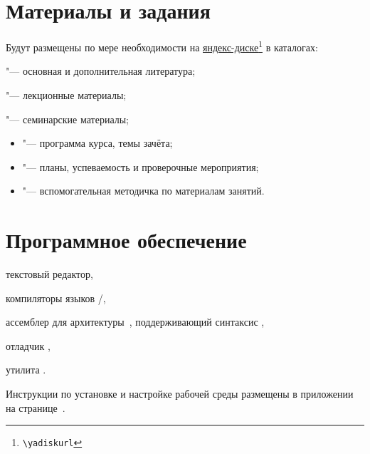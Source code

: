 \section{Материалы и задания}
Будут размещены по мере необходимости на \href{\yadiskurl}{яндекс-диске\footnote{\nolinkurl{\yadiskurl}}} в каталогах:
\begin{itemfeature}
  \item {} "--- основная и дополнительная литература;
  \item {} "--- лекционные материалы;
  \item {} "--- семинарские материалы;
  \begin{itemize}
    \item {} "--- программа курса, темы зачёта;
    \item {} "--- планы, успеваемость и проверочные мероприятия;
    \item {} "--- вспомогательная методичка по материалам занятий.
  \end{itemize}
\end{itemfeature}



\section{Программное обеспечение}
\begin{itemfeature}
  \item текстовый редактор,
  \item компиляторы языков /,
  \item ассемблер для архитектуры \,, поддерживающий синтаксис ,
  \item отладчик ,
  \item утилита .
\end{itemfeature}

Инструкции по установке и настройке рабочей среды размещены в приложении на странице~\pageref{sect:workEnv}.
